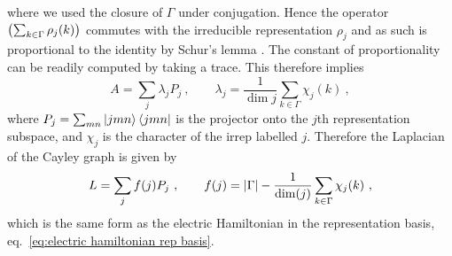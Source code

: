 where we used the closure of $\Gamma$ under conjugation.
Hence the operator $\pqty{\sum_{k \in \Gamma} \rho_j(k)}$ commutes with the irreducible representation $\rho_j$ and as such is proportional to the identity by Schur's lemma \cite{Serre}.
The constant of proportionality can be readily computed by taking a trace.
This therefore implies
\begin{equation}
    A = \sum_j \lambda_j P_j \ , \quad \quad \lambda_j = \frac{1}{\dim{j}} \sum_{k \in \Gamma} \chi_j(k) \ ,
\end{equation}
where $P_j = \sum_{mn} \ket{jmn}\bra{jmn}$ is the projector onto the $j$th representation subspace, and $\chi_j$ is the character of the irrep labelled $j$.
Therefore the Laplacian of the Cayley graph is given by
\begin{equation}\label{eq:laplacian finite group}
    L = \sum_j f(j) P_j \ , \quad \quad f(j)= \abs{\Gamma}-\frac{1}{\mathrm{dim}(j)} \sum_{k \in \Gamma} \chi_j(k) \ ,
\end{equation}
which is the same form as the electric Hamiltonian in the representation basis, eq.~\eqref{eq:electric hamiltonian rep basis}.

